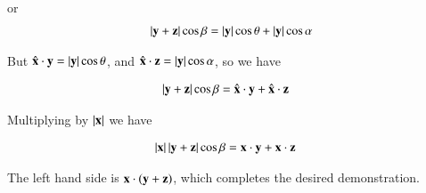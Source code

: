 or
\begin{align*}
{\Abs{\By + \Bz}} \cos\beta &= {\Abs{\By}\cos\theta + \Abs{\By}\cos\alpha} \\
\end{align*}

But $\xcap \cdot \By = \Abs{\By}\cos\theta $, and $\xcap \cdot \Bz = \Abs{\By}\cos\alpha $, so we have

\begin{align*}
{\Abs{\By + \Bz}} \cos\beta &= \xcap \cdot \By + \xcap \cdot \Bz
\end{align*}

Multiplying by $\Abs{\Bx}$ we have

\begin{align*}
\Abs{\Bx} {\Abs{\By + \Bz}} \cos\beta &= \Bx \cdot \By + \Bx \cdot \Bz
\end{align*}

The left hand side is $\Bx \cdot (\By + \Bz)$, which completes the desired demonstration.

%
%

%
